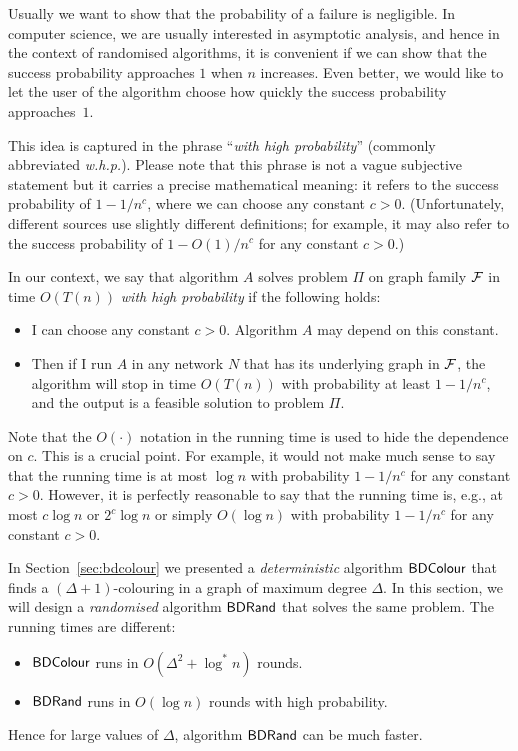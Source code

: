 Usually we want to show that the probability of a failure is negligible. In computer science, we are usually interested in asymptotic analysis, and hence in the context of randomised algorithms, it is convenient if we can show that the success probability approaches $1$ when $n$ increases. Even better, we would like to let the user of the algorithm choose how quickly the success probability approaches~$1$.

This idea is captured in the phrase ``\emph{with high probability}'' (commonly abbreviated \emph{w.h.p.}). Please note that this phrase is not a vague subjective statement but it carries a precise mathematical meaning: it refers to the success probability of $1 - 1/n^c$, where we can choose any constant $c > 0$. (Unfortunately, different sources use slightly different definitions; for example, it may also refer to the success probability of $1 - O(1)/n^c$ for any constant $c > 0$.)

In our context, we say that algorithm $A$ solves problem $\Pi$ on graph family $\mathcal{F}$ in time $O(T(n))$ \emph{with high probability} if the following holds:
\begin{itemize}
    \item I can choose any constant $c > 0$. Algorithm $A$ may depend on this constant.
    \item Then if I run $A$ in any network $N$ that has its underlying graph in $\mathcal{F}$, the algorithm will stop in time $O(T(n))$ with probability at least $1 - 1/n^c$, and the output is a feasible solution to problem $\Pi$.
\end{itemize}
Note that the $O(\cdot)$ notation in the running time is used to hide the dependence on $c$. This is a crucial point. For example, it would not make much sense to say that the running time is at most $\log n$ with probability $1 - 1/n^c$ for any constant $c > 0$. However, it is perfectly reasonable to say that the running time is, e.g., at most $c \log n$ or $2^c \log n$ or simply $O(\log n)$ with probability $1 - 1/n^c$ for any constant $c > 0$.


\label{sec:bdrand}

In Section~\ref{sec:bdcolour} we presented a \emph{deterministic} algorithm $\textup{\sffamily BDColour}$ that finds a ${(\Delta+1)}$-colouring in a graph of maximum degree $\Delta$. In this section, we will design a \emph{randomised} algorithm $\textup{\sffamily BDRand}$ that solves the same problem. The running times are different:
\begin{itemize}[noitemsep]
    \item $\textup{\sffamily BDColour}$ runs in $O(\Delta^2 + \log^* n)$ rounds.
    \item $\textup{\sffamily BDRand}$ runs in $O(\log n)$ rounds with high probability.
\end{itemize}
Hence for large values of $\Delta$, algorithm $\textup{\sffamily BDRand}$ can be much faster.


